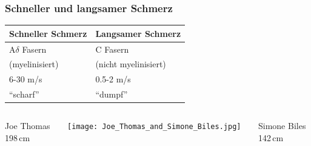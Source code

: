 \documentclass{beamer}
\begin{document}
\begin{frame}
\frametitle{Schneller und langsamer Schmerz}

\begin{center}

\begin{tabular}{|l|l|}
\hline
Schneller Schmerz       & Langsamer Schmerz \\
\hline
A\(\delta\) Fasern     & C Fasern \\
(myelinisiert)          & (nicht myelinisiert) \\
6-30 m/s                & 0.5-2 m/s \\
``scharf''              & ``dumpf'' \\
\hline
\end{tabular}

\end{center}


\pause


\begin{columns}[c]


\begin{column}{2.5cm}
\begin{flushright}
Joe Thomas \\
198\,cm \\
\end{flushright}
\end{column}


\begin{column}{6cm}
\begin{center}
\texttt{[image: Joe\_Thomas\_and\_Simone\_Biles.jpg]}
\end{center}

\end{column}

\begin{column}{2.5cm}
Simone Biles \\
 	142\,cm  \\
\end{column}


\end{columns}



\end{frame}
\end{document}

